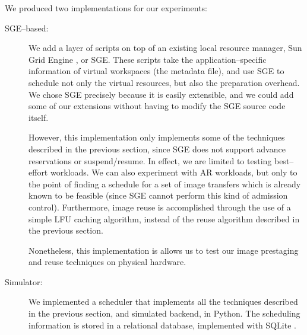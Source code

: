 We produced two implementations for our experiments:

\begin{description}
\item[SGE--based:] We add a layer of scripts on top of an existing local resource manager, Sun Grid Engine
\cite{sgeweb}, or SGE. These scripts take the application--specific information of virtual workspaces (the metadata file), and use SGE to schedule not only the virtual resources, but also the preparation overhead. We chose SGE precisely because it is easily extensible, and we could add some of our extensions without having to modify the SGE source code itself.

However, this implementation only implements some of the techniques described in the previous section, since SGE does not support advance reservations or suspend/resume. In effect, we are limited to testing best--effort workloads. We can also experiment with AR workloads, but only to the point of finding a schedule for a set of image transfers which is already known to be feasible (since SGE cannot perform this kind of admission control). Furthermore, image reuse is accomplished through the use of a simple LFU caching algorithm, instead of the reuse algorithm described in the previous section.

Nonetheless, this implementation is allows us to test our image prestaging and reuse techniques on physical hardware.
\item[Simulator:] We implemented a scheduler that implements all the techniques described in the previous section, and simulated backend, in Python. The scheduling information is stored in a relational database, implemented with SQLite \cite{sqlite}.
\end{description}
